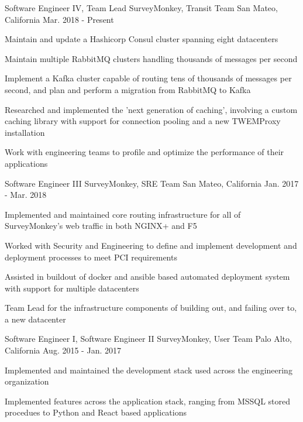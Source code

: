 \begin{cventries}
  \cventry
    {Software Engineer IV, Team Lead}
    {SurveyMonkey, Transit Team}
    {San Mateo, California}
    {Mar. 2018 - Present}
    {
      \begin{cvitems}
        \item {Maintain and update a Hashicorp Consul cluster spanning eight datacenters}
        \item {Maintain multiple RabbitMQ clusters handling thousands of messages per second}
        \item {Implement a Kafka cluster capable of routing tens of thousands of messages per second, and plan and perform a migration from RabbitMQ to Kafka}
        \item {Researched and implemented the 'next generation of caching', involving a custom caching library with support for connection pooling and a new TWEMProxy installation}
        \item {Work with engineering teams to profile and optimize the performance of their applications}
      \end{cvitems}
    }
  \cventry
    {Software Engineer III}
    {SurveyMonkey, SRE Team}
    {San Mateo, California}
    {Jan. 2017 - Mar. 2018}
    {
      \begin{cvitems}
        \item {Implemented and maintained core routing infrastructure for all of SurveyMonkey's web traffic in both NGINX+ and F5}
        \item {Worked with Security and Engineering to define and implement development and deployment processes to meet PCI requirements}
        \item {Assisted in buildout of docker and ansible based automated deployment system with support for multiple datacenters}
        \item {Team Lead for the infrastructure components of building out, and failing over to, a new datacenter}
      \end{cvitems}
    }
  \cventry
    {Software Engineer I, Software Engineer II}
    {SurveyMonkey, User Team}
    {Palo Alto, California}
    {Aug. 2015 - Jan. 2017}
    {
      \begin{cvitems}
        \item {Implemented and maintained the development stack used across the engineering organization}
        \item {Implemented features across the application stack, ranging from MSSQL stored procedues to Python and React based applications}

\end{cvitems}}
\end{cventries}
